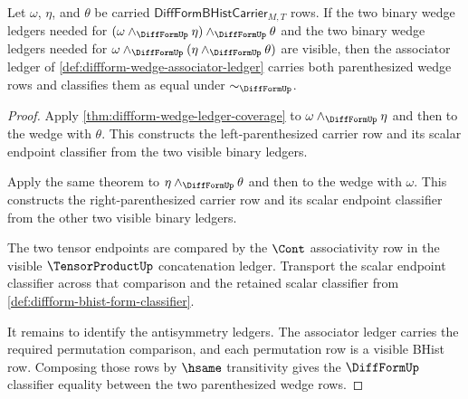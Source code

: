 \begin{theorem}
\label{thm:diffform-wedge-associator-closure}
Let $\omega$, $\eta$, and $\theta$ be carried
$\mathsf{DiffFormBHistCarrier}_{M,T}$ rows. If the two binary wedge ledgers
needed for $(\omega\wedge_{\DiffFormUp}\eta)\wedge_{\DiffFormUp}\theta$ and
the two binary wedge ledgers needed for
$\omega\wedge_{\DiffFormUp}(\eta\wedge_{\DiffFormUp}\theta)$ are visible, then
the associator ledger of
\autoref{def:diffform-wedge-associator-ledger} carries both parenthesized
wedge rows and classifies them as equal under $\sim_{\DiffFormUp}$.
\end{theorem}
\begin{proof}
Apply \autoref{thm:diffform-wedge-ledger-coverage} to
$\omega\wedge_{\DiffFormUp}\eta$ and then to the wedge with $\theta$. This
constructs the left-parenthesized carrier row and its scalar endpoint
classifier from the two visible binary ledgers.

Apply the same theorem to $\eta\wedge_{\DiffFormUp}\theta$ and then to the
wedge with $\omega$. This constructs the right-parenthesized carrier row and
its scalar endpoint classifier from the other two visible binary ledgers.

The two tensor endpoints are compared by the $\Cont$ associativity row in the
visible $\TensorProductUp$ concatenation ledger. Transport the scalar endpoint
classifier across that comparison and the retained scalar classifier from
\autoref{def:diffform-bhist-form-classifier}.

It remains to identify the antisymmetry ledgers. The associator ledger carries
the required permutation comparison, and each permutation row is a visible
BHist row. Composing those rows by $\hsame$ transitivity gives the
$\DiffFormUp$ classifier equality between the two parenthesized wedge rows.
\end{proof}

